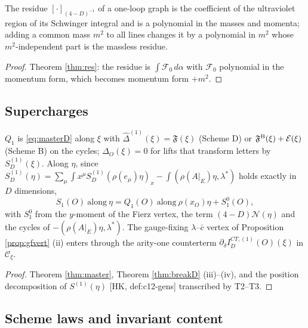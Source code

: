 \begin{proposition}
\label{prop:irsafe}
The residue $[\cdot]_{(4-D)^{-1}}$ of a one-loop graph is the coefficient of the ultraviolet region of its Schwinger integral and is a polynomial in the masses and momenta; adding a common mass $m^2$ to all lines changes it by a polynomial in $m^2$ whose $m^2$-independent part is the massless residue.
\end{proposition}

\begin{proof}
Theorem \ref{thm:res}: the residue is $\int\mathcal F_0\,d\alpha$ with $\mathcal F_0$ polynomial in the momentum form, which becomes momentum form $+m^2$.
\end{proof}

\subsection{Supercharges}

\begin{proposition}[$Q_1$ and $S_1$ in DR]
\label{prop:QS}
$Q_1$ is \eqref{eq:masterD} along $\xi$ with $\widehat\Delta^{(1)}(\xi)=\mathfrak F(\xi)$ (Scheme D) or $\mathfrak F^{\rm B}(\xi)+\mathcal E(\xi)$ (Scheme B) on the cycles; $\widehat\Delta_O(\xi)=0$ for lifts that transform letters by $S^{(1)}_D(\xi)$. Along $\eta$, since $S^{(1)}_D(\eta)=\sum_\mu\int x^\mu S^{(1)}_D(\rho(e_\mu)\eta)_x-\int(\rho(A|_E)\eta,\lambda^*)$ holds exactly in $D$ dimensions,
\[
S_1(O)\ \text{along}\ \eta=Q_1(O)\ \text{along}\ \rho(x_O)\eta+S^0_1(O),
\]
with $S^0_1$ from the $y$-moment of the Fierz vertex, the term $(4-D)\mathcal N(\eta)$ and the cycles of $-(\rho(A|_E)\eta,\lambda^*)$. The gauge-fixing $\lambda$--$\bar c$ vertex of Proposition \ref{prop:gfvert} (ii) enters through the arity-one counterterm $\partial_\delta I^{CT,(1)}_D(O)(\xi)$ in $\mathcal C_\xi$.
\end{proposition}

\begin{proof}
Theorem \ref{thm:master}, Theorem \ref{thm:breakD} (iii)--(iv), and the position decomposition of $S^{(1)}(\eta)$ [HK, def:c12-gens] transcribed by T2--T3.
\end{proof}

\subsection{Scheme laws and invariant content}


